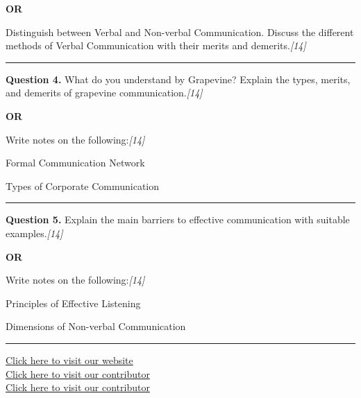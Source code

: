 \documentclass[11pt,a4paper]{article}
\newcommand{\pts}[1]{\hfill   \textit{[#1]}}
\begin{document}
\centerline{   \textbf{OR}}

Distinguish between Verbal and Non-verbal Communication. Discuss the different methods of Verbal Communication with their merits and demerits.\pts{14}

\medskip\rule{\linewidth}{0.2pt}




\noindent   \textbf{Question 4.}
What do you understand by Grapevine? Explain the types, merits, and demerits of grapevine communication.\pts{14}

\centerline{   \textbf{OR}}

Write notes on the following:\pts{14}

\begin{parts}
  \item Formal Communication Network
  \item Types of Corporate Communication
\end{parts}

\medskip\rule{\linewidth}{0.2pt}




\noindent   \textbf{Question 5.}
Explain the main barriers to effective communication with suitable examples.\pts{14}

\centerline{   \textbf{OR}}

Write notes on the following:\pts{14}

\begin{parts}
  \item Principles of Effective Listening
  \item Dimensions of Non-verbal Communication
\end{parts}

\vfill
\rule{\linewidth}{0.4pt}

\begin{center}\small
\href{https://bhu-exam.vercel.app/}{Click here to visit our website}\\[4pt]
\href{https://me-aryan.vercel.app/}{Click here to visit our contributor}\\[4pt]
\href{https://quashan-me.vercel.app/}{Click here to visit our contributor}
\end{center}
\end{document}
